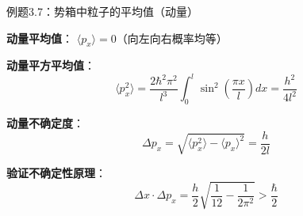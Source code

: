 \documentclass[aspectratio=169, 10pt]{beamer}
\begin{document}
\begin{frame}{例题3.7：势箱中粒子的平均值（动量）}

  \begin{iqbitemize}
    \item \textbf{动量平均值}：
    $\langle p_x \rangle = 0$（向左向右概率均等）

    \item \textbf{动量平方平均值}：
    \[
      \langle p_x^2 \rangle = \dfrac{2\hbar^2\pi^2}{l^3}\int_0^l \sin^2\left(\dfrac{\pi x}{l}\right)dx = \dfrac{h^2}{4l^2}
    \]

    \item \textbf{动量不确定度}：
    \[
      \Delta p_x = \sqrt{\langle p_x^2 \rangle - \langle p_x \rangle^2} = \dfrac{h}{2l}
    \]

    \item \textbf{验证不确定性原理}：
    \[
      \Delta x \cdot \Delta p_x = \dfrac{h}{2}\sqrt{\dfrac{1}{12} - \dfrac{1}{2\pi^2}} > \dfrac{\hbar}{2}
    \]
  \end{iqbitemize}

\end{frame}
\end{document}
